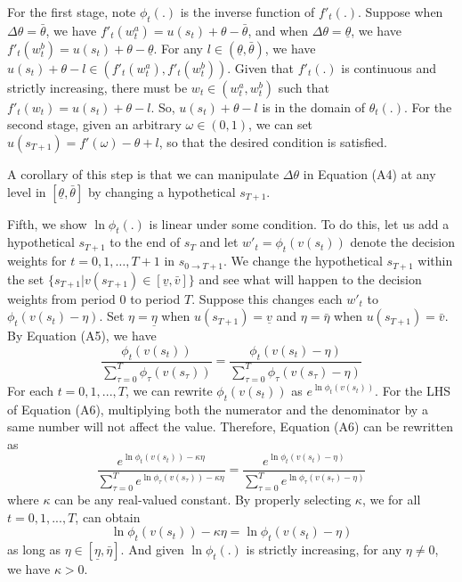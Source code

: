 \documentclass[
  12pt,
]{article}
\begin{document}
For the first stage, note \(\phi_t(.)\) is the inverse function of
\(f'_t(.)\). Suppose when \(\Delta\theta=\bar{\theta}\), we have
\(f'_t(w^{a}_t)=u(s_t)+\theta-\bar{\theta}\), and when
\(\Delta\theta=\underline{\theta}\), we have
\(f'_t(w^{b}_t)=u(s_t)+\theta-\underline{\theta}\). For any
\(l\in(\underline{\theta},\bar{\theta})\), we have
\(u(s_t)+\theta-l \in (f'_t(w^a_t),f'_t(w^b_t))\). Given that
\(f'_t(.)\) is continuous and strictly increasing, there must be
\(w_t\in(w^a_t,w^b_t)\) such that \(f'_t(w_t)=u(s_t)+\theta-l\). So,
\(u(s_t)+\theta-l\) is in the domain of \(\theta_t(.)\). For the second
stage, given an arbitrary \(\omega\in(0,1)\), we can set
\(u(s_{T+1})=f'(\omega)-\theta+l\), so that the desired condition is
satisfied.

A corollary of this step is that we can manipulate \(\Delta \theta\) in
Equation (A4) at any level in \([\underline{\theta},\bar{\theta}]\) by
changing a hypothetical \(s_{T+1}\).

Fifth, we show \(\ln \phi_t(.)\) is linear under some condition. To do
this, let us add a hypothetical \(s_{T+1}\) to the end of \(s_T\) and
let \(w'_t=\phi_t(v(s_t))\) denote the decision weights for
\(t=0,1,…,T+1\) in \(s_{0\rightarrow T+1}\). We change the hypothetical
\(s_{T+1}\) within the set
\(\{s_{T+1}|v(s_{T+1})\in[\underline{v},\bar{v}]\}\) and see what will
happen to the decision weights from period 0 to period \(T\). Suppose
this changes each \(w'_t\) to \(\phi_t(v(s_t)-\eta)\). Set
\(\eta=\underline{\eta}\) when \(u(s_{T+1})=\underline{v}\) and
\(\eta=\bar{\eta}\) when \(u(s_{T+1})=\bar{v}\). By Equation (A5), we
have\[\tag{A6}
\frac{\phi_t(v(s_t))}{\sum_{\tau=0}^{T}\phi_\tau(v(s_\tau))} = \frac{\phi_t(v(s_t)-\eta)}{\sum_{\tau=0}^{T}\phi_\tau(v(s_\tau)-\eta)}
\]For each \(t=0,1,...,T\), we can rewrite \(\phi_t(v(s_t))\) as
\(e^{\ln \phi_t(v(s_t))}\). For the LHS of Equation (A6), multiplying
both the numerator and the denominator by a same number will not affect
the value. Therefore, Equation (A6) can be rewritten as \[
\frac{e^{\ln\phi_t(v(s_t))-\kappa\eta}}{\sum_{\tau=0}^{T}e^{\ln\phi_\tau(v(s_\tau))-\kappa\eta}} = \frac{e^{\ln\phi_t(v(s_t)-\eta)}}{\sum_{\tau=0}^{T}e^{\ln\phi_\tau(v(s_\tau)-\eta)}}
\]where \(\kappa\) can be any real-valued constant. By properly
selecting \(\kappa\), we for all \(t=0,1,...,T\), can obtain\[\tag{A7}
\ln \phi_t(v(s_t))-\kappa\eta=\ln \phi_t(v(s_t)-\eta)
\]as long as \(\eta \in [\underline{\eta},\bar{\eta}]\). And given
\(\ln\phi_t(.)\) is strictly increasing, for any \(\eta\neq 0\), we have
\(\kappa>0\).
\end{document}
